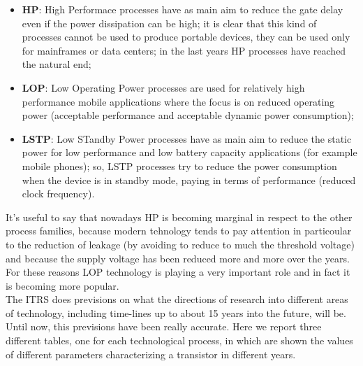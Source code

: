 \documentclass[a4paper, 12pt, twoside, openright]{report}
\begin{document}
	\begin{itemize}
	\item \textbf{HP}: High Performace processes have as main aim to reduce the gate delay even if the power dissipation can be high; it is clear that this kind of processes cannot be used to produce portable devices, they can be used only for mainframes or data centers; in the last years HP processes have reached the natural end;
	\item \textbf{LOP}: Low Operating Power processes are used for relatively high performance mobile applications where the focus is on reduced operating power (acceptable performance and acceptable dynamic power consumption);
	\item \textbf{LSTP}: Low STandby Power processes have as main aim to reduce the static power for low performance and low battery capacity applications (for example mobile phones); so, LSTP processes try to reduce the power consumption when the device is in standby mode, paying in terms of performance (reduced clock frequency).
	\end{itemize}

It's useful to say that nowadays HP is becoming marginal in respect to the other process families, because modern tehnology tends to pay attention in particoular to the reduction of leakage (by avoiding to reduce to much the threshold voltage) and because the supply voltage has been reduced more and more over the years. For these reasons LOP technology is playing a very important role and in fact it is becoming more popular. \\ The ITRS does previsions on what the directions of research into different areas of technology, including time-lines up to about 15 years into the future, will be. Until now, this previsions have been really accurate.
Here we report three different tables, one for each technological process, in which are shown the values of different parameters characterizing a transistor in different years.\\
\end{document}
